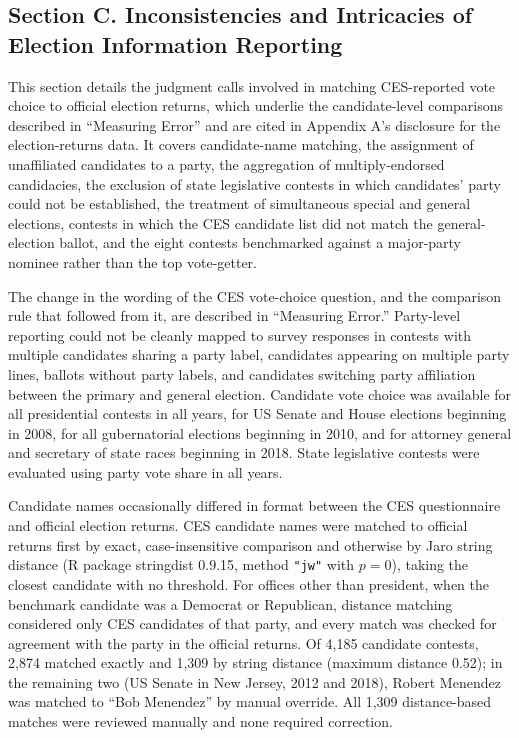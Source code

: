 \documentclass[12pt]{article}
\begin{document}
\subsection*{Section C. Inconsistencies and Intricacies of Election Information Reporting}
{}
\label{app:inconsistencies_election_info}

This section details the judgment calls involved in matching CES-reported vote choice to official election returns, which underlie the candidate-level comparisons described in ``Measuring Error'' and are cited in Appendix A's disclosure for the election-returns data. It covers candidate-name matching, the assignment of unaffiliated candidates to a party, the aggregation of multiply-endorsed candidacies, the exclusion of state legislative contests in which candidates' party could not be established, the treatment of simultaneous special and general elections, contests in which the CES candidate list did not match the general-election ballot, and the eight contests benchmarked against a major-party nominee rather than the top vote-getter.

The change in the wording of the CES vote-choice question, and the comparison rule that followed from it, are described in ``Measuring Error.'' Party-level reporting could not be cleanly mapped to survey responses in contests with multiple candidates sharing a party label, candidates appearing on multiple party lines, ballots without party labels, and candidates switching party affiliation between the primary and general election. Candidate vote choice was available for all presidential contests in all years, for US Senate and House elections beginning in 2008, for all gubernatorial elections beginning in 2010, and for attorney general and secretary of state races beginning in 2018. State legislative contests were evaluated using party vote share in all years.

Candidate names occasionally differed in format between the CES questionnaire and official election returns. CES candidate names were matched to official returns first by exact, case-insensitive comparison and otherwise by Jaro string distance \parencite{jaro_advances_1989} (R package stringdist 0.9.15, method \texttt{"jw"} with $p = 0$), taking the closest candidate with no threshold. For offices other than president, when the benchmark candidate was a Democrat or Republican, distance matching considered only CES candidates of that party, and every match was checked for agreement with the party in the official returns. Of 4,185 candidate contests, 2,874 matched exactly and 1,309 by string distance (maximum distance 0.52); in the remaining two (US Senate in New Jersey, 2012 and 2018), Robert Menendez was matched to ``Bob Menendez'' by manual override. All 1,309 distance-based matches were reviewed manually and none required correction.
\end{document}
